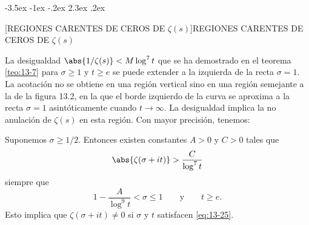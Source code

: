 \documentclass[12pt,a4paper]{book}
\makeatletter
\renewcommand\section{\@startsection{section}{1}{\z@}%
  {-3.5ex \@plus -1ex \@minus -.2ex}%
  {2.3ex \@plus .2ex}%
  {\normalfont\Large\bfseries\raggedright}}
\makeatother
\begin{document}
    \section[REGIONES CARENTES DE CEROS DE \texorpdfstring{$\zeta(s)$}{ζ(s)}]{REGIONES CARENTES DE CEROS DE \texorpdfstring{$\zeta(s)$}{ζ(s)}}

    La desigualdad $\abs{1/\zeta(s)}<M\log^{7}t$ que se ha demostrado en el teorema
    \ref{teo:13-7} para $\sigma\geq1$ y $t\geq e$ se puede extender a la izquierda de la recta
    $\sigma=1$. La acotación no se obtiene en una región vertical sino en una región semejante
    a la de la figura 13.2, en la que el borde izquierdo de la curva se aproxima a la recta
    $\sigma=1$ asintóticamente cuando $t\to\infty$. La desigualdad implica la no anulación de
    $\zeta(s)$ en esta región. Con mayor precisión, tenemos:

    \begin{teorema}\label{teo:13-10}
        Suponemos $\sigma\geq1/2$. Entonces existen constantes $A>0$ y $C>0$ tales que
        \begin{equation*}
            \abs{\zeta(\sigma+it)}>\frac{C}{\log^{7}t}
        \end{equation*}
        siempre que
        \begin{equation}\label{eq:13-25}
            1-\frac{A}{\log^{9}t}<\sigma\leq1\qquad\text{y}\qquad t\geq e.
        \end{equation}
        Esto implica que $\zeta(\sigma+it)\neq0$ si $\sigma$ y $t$ satisfacen \eqref{eq:13-25}.
    \end{teorema}
\end{document}
